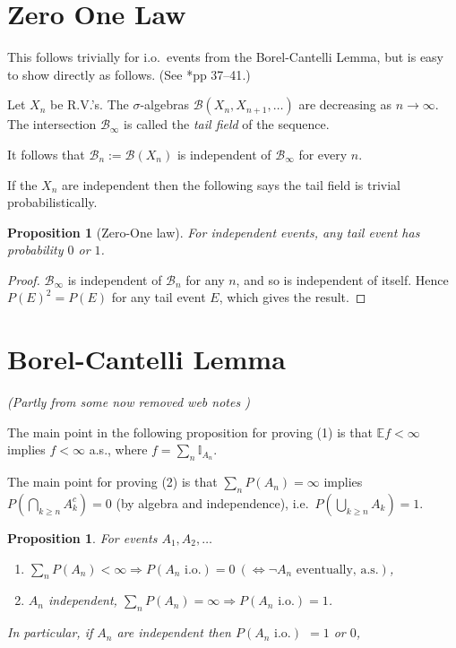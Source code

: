 \documentclass[a4paper]{amsart}
\theoremstyle{plain}
\newtheorem{proposition}[theorem]{Proposition}
\theoremstyle{definition}
\theoremstyle{remark}
\begin{document}
\section{Zero One Law}  This follows trivially for i.o.\ events from the Borel-Cantelli Lemma, but is easy to show directly as follows.
(See \cite{Lam}*{pp 37--41}.)



Let $ X_n $ be R.V.'s.  The $ \sigma $-algebras $ \mathcal{B}(X_n,X_{n+1}, \dots ) $  are decreasing as $ n \to \infty $.  The intersection $ \mathcal{B}_\infty $ is called the \emph{tail field} of the sequence.

It follows that $ \mathcal{B}_n := \mathcal{B} (X_n ) $ is independent of $   \mathcal{B}_\infty $ for every $ n $.

If the $ X_n $ are independent then the following says   the tail field is trivial probabilistically.

\begin{proposition}
[Zero-One law]  For independent events, any tail event has probability $ 0 $ or $ 1 $.
\end{proposition} 

\begin{proof} $ \mathcal{B}_\infty $ is independent of $ \mathcal{B}_n $ for any $ n $, and so is independent of itself.  Hence $ P(E)^2 = P(E) $ for any tail event $ E $, which gives the result.
\end{proof} 




\section{Borel-Cantelli Lemma}

\noindent \emph{(Partly from some now removed web notes \cite{Che})}

The main point in the following proposition for proving  (1) is that $  \mathbb{E} f< \infty  $ implies $ f < \infty $ a.s., where $ f = \sum_n \mathbb{I} _{A_n}$.

The main point for proving (2) is that $ \sum_n P(A_n) = \infty $ implies $ P \left(\bigcap_{k \geq n} A^c_k\right) = 0 $ (by algebra and independence), i.e.\  $ P \left(\bigcup_{k \geq n} A _k\right) = 1 $.


\begin{proposition}  
For events $ A_1, A_2, \dots $ 
\begin{enumerate}

\item $ \sum_n P(A_n) <\infty \Longrightarrow P(A_n \text{ i.o.}) = 0 \ (\Longleftrightarrow  \neg A_n    \text{ eventually, a.s.})$,
%
\item $ A_n $ independent, $ \sum_n P(A_n) = \infty \Longrightarrow P(A_n \text{ i.o.}) = 1 $. 
\end{enumerate}
In particular, if $ A_n $ are independent then  $ P(A_n \text{ i.o.})$ $ = 1 $ or $ 0 $, 
\end{proposition} 
\end{document}
